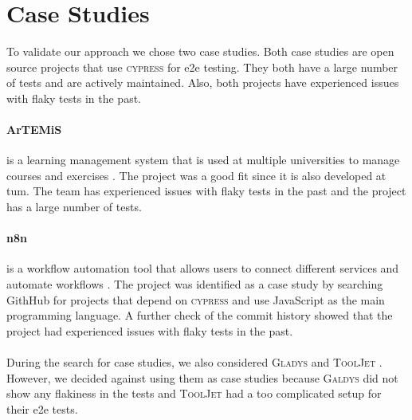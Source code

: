 \section{Case Studies}
To validate our approach we chose two case studies.
Both case studies are open source projects that use \textsc{cypress} for \ac{e2e} testing.
They both have a large number of tests and are actively maintained.
Also, both projects have experienced issues with flaky tests in the past.

\paragraph{ArTEMiS} is a learning management system that is used at multiple universities to manage courses and exercises \autocite{krusche_artemis_2018}.
The project was a good fit since it is also developed at \ac{tum}.
The team has experienced issues with flaky tests in the past and the project has a large number of tests.

\paragraph{n8n} is a workflow automation tool that allows users to connect different services and automate workflows \autocite{noauthor_n8n_2023}. The project was identified as a case study by searching GithHub for projects that depend on \textsc{cypress} and use JavaScript as the main programming language. A further check of the commit history showed that the project had experienced issues with flaky tests in the past.

\paragraph{} During the search for case studies, we also considered \textsc{Gladys} \autocite{noauthor_gladys_2023} and \textsc{ToolJet} \autocite{noauthor_tooljettooljet_2023}. However, we decided against using them as case studies because \textsc{Galdys} did not show any flakiness in the tests and \textsc{ToolJet} had a too complicated setup for their \ac{e2e} tests.

